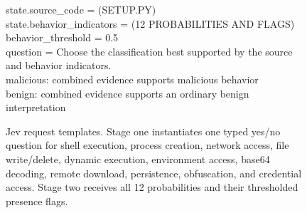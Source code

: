 \begin{figure}[!t]
{\begin{minipage}[t]{0.30\textwidth}
        state.source\_code = (SETUP.PY)\\
        state.behavior\_indicators = (12 PROBABILITIES AND FLAGS)\\
        behavior\_threshold = 0.5\\[0.5ex]
        question = Choose the classification best supported by the source and
        behavior indicators.\\
        malicious: combined evidence supports malicious behavior\\
        benign: combined evidence supports an ordinary benign interpretation
        \vspace{2ex}
    \end{minipage}}
    \caption{Jev request templates. Stage one instantiates one typed yes/no
    question for shell execution, process creation, network access, file
    write/delete, dynamic execution, environment access, base64 decoding,
    remote download, persistence, obfuscation, and credential access. Stage
    two receives all 12 probabilities and their thresholded presence flags.}
    \label{fig:jev-prompts}
\end{figure}

\endinput
